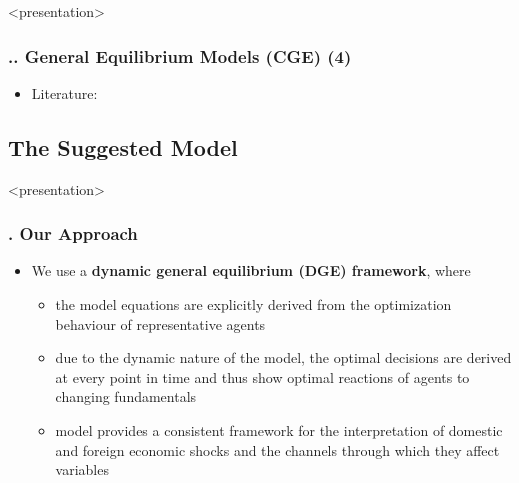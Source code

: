 \documentclass[11pt,aspectratio=169]{beamer}
\begin{document}
\begin{frame}<presentation>
	\frametitle{{\thesection.\thesubsection.\thesubsubsection} General Equilibrium Models (CGE) (4)}	
	\begin{itemize}
		\item Literature:
\end{itemize}	
\end{frame}

\subsection{The Suggested Model}

\begin{frame}<presentation>
	\frametitle{{\thesection.\thesubsection} Our Approach}
	\begin{itemize}	
	\item We use a \textbf{dynamic general equilibrium (DGE) framework}, where 
	\begin{itemize}
		\item the model equations are explicitly derived from the optimization behaviour of representative agents
		\item due to the dynamic nature of the model, the optimal decisions are derived at every point in time and thus show optimal reactions of agents to changing fundamentals
		\item model provides a consistent framework for the interpretation of domestic and foreign economic shocks and the channels through which they affect variables
	\end{itemize}		
	\end{itemize}
\end{frame}
\end{document}
